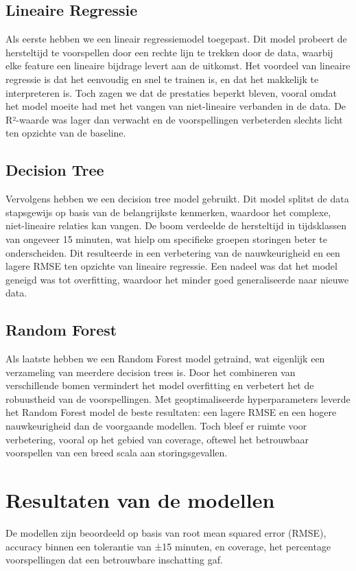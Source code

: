 \documentclass{article}
\begin{document}
\subsection{Lineaire Regressie}
Als eerste hebben we een lineair regressiemodel toegepast. Dit model probeert de hersteltijd te voorspellen door een rechte lijn te trekken door de data, waarbij elke feature een lineaire bijdrage levert aan de uitkomst. Het voordeel van lineaire regressie is dat het eenvoudig en snel te trainen is, en dat het makkelijk te interpreteren is. Toch zagen we dat de prestaties beperkt bleven, vooral omdat het model moeite had met het vangen van niet-lineaire verbanden in de data. De R²-waarde was lager dan verwacht en de voorspellingen verbeterden slechts licht ten opzichte van de baseline.

\subsection{Decision Tree}
Vervolgens hebben we een decision tree model gebruikt. Dit model splitst de data stapsgewijs op basis van de belangrijkste kenmerken, waardoor het complexe, niet-lineaire relaties kan vangen. De boom verdeelde de hersteltijd in tijdsklassen van ongeveer 15 minuten, wat hielp om specifieke groepen storingen beter te onderscheiden. Dit resulteerde in een verbetering van de nauwkeurigheid en een lagere RMSE ten opzichte van lineaire regressie. Een nadeel was dat het model geneigd was tot overfitting, waardoor het minder goed generaliseerde naar nieuwe data.

\subsection{Random Forest}
Als laatste hebben we een Random Forest model getraind, wat eigenlijk een verzameling van meerdere decision trees is. Door het combineren van verschillende bomen vermindert het model overfitting en verbetert het de robuustheid van de voorspellingen. Met geoptimaliseerde hyperparameters leverde het Random Forest model de beste resultaten: een lagere RMSE en een hogere nauwkeurigheid dan de voorgaande modellen. Toch bleef er ruimte voor verbetering, vooral op het gebied van coverage, oftewel het betrouwbaar voorspellen van een breed scala aan storingsgevallen.

\section{Resultaten van de modellen}
De modellen zijn beoordeeld op basis van root mean squared error (RMSE), accuracy binnen een tolerantie van ±15 minuten, en coverage, het percentage voorspellingen dat een betrouwbare inschatting gaf.
\end{document}
